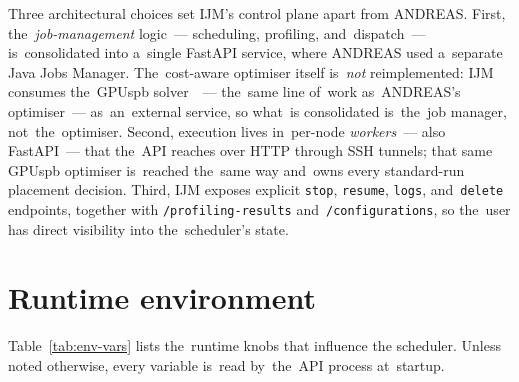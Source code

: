 Three architectural choices set IJM's control plane apart from ANDREAS.
First, the~\emph{job-management} logic~--- scheduling, profiling, and~dispatch~---
is~consolidated into a~single FastAPI service, where ANDREAS used a~separate
Java Jobs Manager.  The~cost-aware optimiser itself is~\emph{not}
reimplemented: IJM consumes the~GPUspb
solver~\cite{filippini2023pathrelinking,filippini2024stochastic}~--- the~same
line of~work as~ANDREAS's optimiser~--- as~an~external service, so what~is
consolidated is~the~job manager, not~the~optimiser.
Second, execution lives in~per-node \emph{workers}~--- also FastAPI~---
that the~API reaches over HTTP through SSH tunnels; that same GPUspb
optimiser is~reached the~same way and~owns every standard-run placement
decision.
Third, IJM exposes explicit \texttt{stop}, \texttt{resume},
\texttt{logs}, and~\texttt{delete} endpoints, together with
\texttt{/profiling-results} and~\texttt{/configurations}, so the~user
has direct visibility into the~scheduler's state.

\section{Runtime environment}

Table~\ref{tab:env-vars} lists the~runtime knobs that influence the
scheduler.  Unless noted otherwise, every variable is~read by~the~API
process at~startup.

